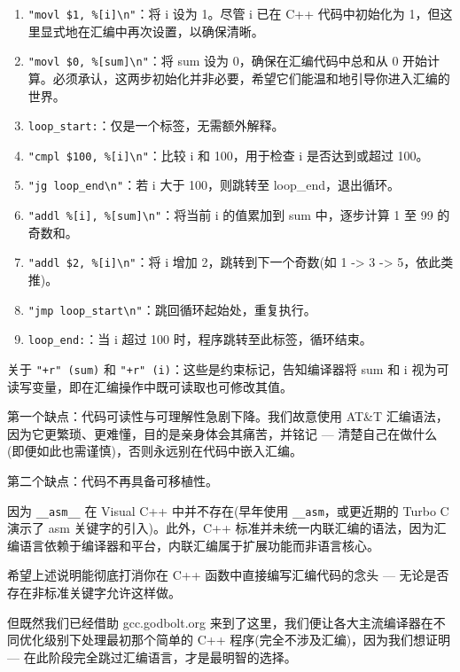 \begin{enumerate}
\item 
\verb|"movl $1, %[i]\n"|：将 i 设为 1。尽管 i 已在 C++ 代码中初始化为 1，但这里显式地在汇编中再次设置，以确保清晰。

\item 
\verb|"movl $0, %[sum]\n"|：将 sum 设为 0，确保在汇编代码中总和从 0 开始计算。必须承认，这两步初始化并非必要，希望它们能温和地引导你进入汇编的世界。

\item 
\verb|loop_start:|：仅是一个标签，无需额外解释。

\item 
\verb|"cmpl $100, %[i]\n"|：比较 i 和 100，用于检查 i 是否达到或超过 100。

\item 
\verb|"jg loop_end\n"|：若 i 大于 100，则跳转至 loop\_end，退出循环。

\item 
\verb|"addl %[i], %[sum]\n"|：将当前 i 的值累加到 sum 中，逐步计算 1 至 99 的奇数和。

\item 
\verb|"addl $2, %[i]\n"|：将 i 增加 2，跳转到下一个奇数(如 1 -> 3 -> 5，依此类推)。

\item 
\verb|"jmp loop_start\n"|：跳回循环起始处，重复执行。

\item 
\verb|loop_end:|：当 i 超过 100 时，程序跳转至此标签，循环结束。
\end{enumerate}

关于 \verb|"+r" (sum)| 和 \verb|"+r" (i)|：这些是约束标记，告知编译器将 sum 和 i 视为可读写变量，即在汇编操作中既可读取也可修改其值。

第一个缺点：代码可读性与可理解性急剧下降。我们故意使用 AT\&T 汇编语法，因为它更繁琐、更难懂，目的是亲身体会其痛苦，并铭记 --- 清楚自己在做什么(即便如此也需谨慎)，否则永远别在代码中嵌入汇编。

第二个缺点：代码不再具备可移植性。

因为 \verb|__asm__| 在 Visual C++ 中并不存在(早年使用 \verb|__asm|，或更近期的 Turbo C 演示了 asm 关键字的引入)。此外，C++ 标准并未统一内联汇编的语法，因为汇编语言依赖于编译器和平台，内联汇编属于扩展功能而非语言核心。

希望上述说明能彻底打消你在 C++ 函数中直接编写汇编代码的念头 --- 无论是否存在非标准关键字允许这样做。

但既然我们已经借助 gcc.godbolt.org 来到了这里，我们便让各大主流编译器在不同优化级别下处理最初那个简单的 C++ 程序(完全不涉及汇编)，因为我们想证明 --- 在此阶段完全跳过汇编语言，才是最明智的选择。

